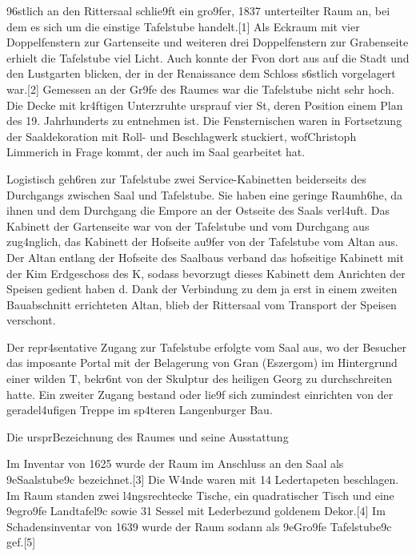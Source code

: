 \documentclass[
  a4paper,
  portrait]{book}
\begin{document}
\x96stlich an den Rittersaal schlie\x9ft ein gro\x9fer, 1837
unterteilter Raum an, bei dem es sich um die einstige Tafelstube
handelt.{[}1{]} Als Eckraum mit vier Doppelfenstern zur Gartenseite und
weiteren drei Doppelfenstern zur Grabenseite erhielt die Tafelstube viel
Licht. Auch konnte der F\xbcrst von dort aus auf die Stadt und den
Lustgarten blicken, der in der Renaissance dem Schloss
s\xbcd{}\xb6stlich vorgelagert war.{[}2{]} Gemessen an der
Gr\x9fe des Raumes war die Tafelstube nicht sehr hoch. Die
Decke mit kr\xa4ftigen Unterz\xbcgen ruhte
urspr\xbcnglich auf vier St\xbctzen, deren Position einem Plan
des 19. Jahrhunderts zu entnehmen ist. Die Fensternischen waren in
Fortsetzung der Saaldekoration mit Roll- und Beschlagwerk stuckiert,
wof\xbcr Christoph Limmerich in Frage kommt, der auch im Saal
gearbeitet hat.

Logistisch geh\xb6ren zur Tafelstube zwei Service-Kabinetten
beiderseits des Durchgangs zwischen Saal und Tafelstube. Sie haben eine
geringe Raumh\xb6he, da \xbcber ihnen und dem Durchgang die
Empore an der Ostseite des Saals verl\xa4uft. Das Kabinett der
Gartenseite war von der Tafelstube und vom Durchgang aus
zug\xa4nglich, das Kabinett der Hofseite au\x9fer von der
Tafelstube vom Altan aus. Der Altan entlang der Hofseite des Saalbaus
verband das hofseitige Kabinett mit der K\xbcche im Erdgeschoss des
K\xbcchenbaus, sodass bevorzugt dieses Kabinett dem Anrichten der
Speisen gedient haben d\xbcrfte. Dank der Verbindung zu dem ja erst
in einem zweiten Bauabschnitt errichteten Altan, blieb der Rittersaal
vom Transport der Speisen verschont.

Der repr\xa4sentative Zugang zur Tafelstube erfolgte vom Saal aus,
wo der Besucher das imposante Portal mit der Belagerung von Gran
(Eszergom) im Hintergrund einer wilden T\xbcrkenschlacht,
bekr\xb6nt von der Skulptur des heiligen Georg zu durchschreiten
hatte. Ein zweiter Zugang bestand oder lie\x9f sich zumindest
einrichten von der geradel\xa4ufigen Treppe im sp\xa4teren
Langenburger Bau.

Die urspr\xbcngliche Bezeichnung des Raumes und seine Ausstattung

Im Inventar von 1625 wurde der Raum im Anschluss an den
Saal als \x9eSaalstube\x9c bezeichnet.{[}3{]} Die
W\xa4nde waren mit 14 Ledertapeten beschlagen. Im Raum standen zwei
l\xa4ngsrechtecke Tische, ein quadratischer Tisch und eine
\x9egro\x9fe Landtafel\x9c sowie 31 Sessel mit
Lederbez\xbcgen und goldenem Dekor.{[}4{]} Im Schadensinventar von
1639 wurde der Raum sodann als \x9eGro\x9fe
Tafelstube\x9c gef\xbchrt.{[}5{]}
\end{document}
